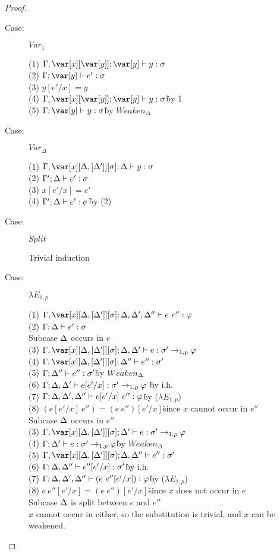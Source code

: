\begin{proof}
\begin{description}
\item[Case:] $Var_1$
\begin{tabbing}
  (1) $\G,\x[\y]; \y \vdash y : \s$\\
  (2) $\G; \y \vdash e' : \s$\\
  (3) $y[e'/x] = y$\\
  (4) $\G,\x[\y]; \y \vdash y : \s$\`by 1\\ 
  (5) $\G; \y\vdash y : \s$\` by $Weaken_\Delta$\\
\end{tabbing}

\item[Case:] $Var_\Delta$
\begin{tabbing}
    (1) $\G, \xD; \D \vdash y : \s$\\
    (2) $\Gamma'; \Delta \vdash e' : \sigma$\\
    (3) $x[e'/x] = e'$\\
    (4) $\Gamma'; \Delta \vdash e' : \sigma$\` by (2)\\
\end{tabbing}

\item[Case:] $Split$
\begin{tabbing}
    Trivial induction
\end{tabbing}

\item[Case:] $\lambda E_{1,p}$
\begin{tabbing}
    (1) $\G, \xD; \D,\D',\D'' \vdash e~e'' : \varphi$\\
    (2) $\Gamma; \Delta \vdash e' : \sigma$\\
    Subcase $\Delta$ occurs in $e$\\
    (3) $\G, \xD; \D,\D' \vdash e : \s' \to_{1,p} \vp$\\
    (4) $\G, \xD; \D'' \vdash e'' : \s'$\\
    (5) $\Gamma; \Delta'' \vdash e'' : \sigma'$\` by $Weaken_\Delta$\\
    (6) $\Gamma; \Delta,\Delta' \vdash e[e'/x] : \sigma' \to_{1,p} \varphi$ \` by i.h.\\
    (7) $\Gamma;\Delta, \Delta', \Delta'' \vdash e[e'/x]~e'' : \varphi$\` by ($\lambda E_{1,p}$)\\
    (8) $(e[e'/x]~e'')=(e~e'')[e'/x]$\` since $x$ cannot occur in $e''$\\
    Subcase $\Delta$ occurs in $e''$\\
    (3) $\G, \xD; \D' \vdash e : \s' \to_{1,p} \vp$\\
    (4) $\Gamma; \Delta' \vdash e : \sigma' \to_{1,p} \varphi$\` by $Weaken_\Delta$\\
    (5) $\G,\xD; \D, \D'' \vdash e'' : \s'$\\
    (6) $\Gamma; \Delta, \Delta'' \vdash e''[e'/x] : \sigma'$\` by i.h.\\
    (7) $\Gamma; \Delta,\Delta',\Delta'' \vdash (e~e''[e'/x]) : \varphi$\` by ($\lambda E_{1,p}$)\\
    (8) $e~e''[e'/x] = (e~e'')[e'/x]$\`since $x$ does not occur in $e$\\
    Subcase $\Delta$ is split between $e$ and $e''$\\
    $x$ cannot occur in either, so the substitution is trivial, and $x$ can be weakened.


\end{tabbing}
\end{description}
\end{proof}
